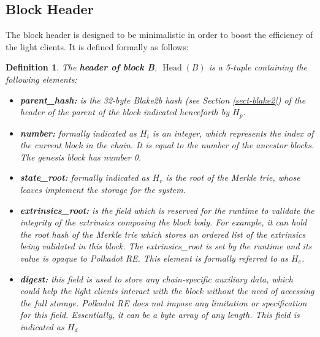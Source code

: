 \documentclass{article}
\newcommand{\tmop}[1]{\ensuremath{\operatorname{#1}}}
\newcommand{\tmsamp}[1]{\textsf{#1}}
\newcommand{\tmstrong}[1]{\textbf{#1}}
\newcommand{\tmtextbf}[1]{{\bfseries{#1}}}
\newcommand{\tmtextsf}[1]{{\sffamily{#1}}}
\newtheorem{definition}{Definition}
\providecommand{\tmop}[1]{\ensuremath{\mathrm{#1}}}
\providecommand{\tmsamp}[1]{\tmtextsf{#1}}
\providecommand{\tmstrong}[1]{\tmtextbf{#1}}
\providecommand{\tmtextbf}[1]{\tmtextbf{#1}}
\newtheorem{definition}{Definition}
\begin{document}
\subsection{Block Header}\label{block}

The block header is designed to be minimalistic in order to boost the
efficiency of the light clients. It is defined formally as follows:

\begin{definition}
  \label{def-block-header}The {\tmstrong{header of block B}},
  {\tmstrong{$\tmop{Head} (B)$}} is a 5-tuple containing the following
  elements:
  \begin{itemize}
    \item \tmtextbf{{\tmsamp{parent\_hash:}}} is the 32-byte Blake2b hash (see
    Section \ref{sect-blake2}) of the header of the parent of the block
    indicated henceforth by \tmtextbf{$H_p$}.
    
    \item {\tmstrong{{\tmsamp{number:}}}} formally indicated as
    {\tmstrong{$H_i$}} is an integer, which represents the index of the
    current block in the chain. It is equal to the number of the ancestor
    blocks. The genesis block has number 0.
    
    \item {\tmstrong{{\tmsamp{state\_root:}}}} formally indicated as
    {\tmstrong{$H_r$}} is the root of the Merkle trie, whose leaves implement
    the storage for the system.
    
    \item {\tmstrong{{\tmsamp{extrinsics\_root:}}}} is the field which is
    reserved for the runtime to validate the integrity of the extrinsics
    composing the block body. For example, it can hold the root hash of the
    Merkle trie which stores an ordered list of the extrinsics being validated
    in this block. The {\tmsamp{extrinsics\_root}} is set by the runtime and
    its value is opaque to Polkadot RE. This element is formally referred to
    as {\tmstrong{$H_e$}}.
    
    \item {\tmstrong{{\tmsamp{digest:}}}} this field is used to store any
    chain-specific auxiliary data, which could help the light clients interact
    with the block without the need of accessing the full storage. Polkadot RE
    does not impose any limitation or specification for this field.
    Essentially, it can be a byte array of any length. This field is indicated
    as {\tmstrong{$H_d$}}
  \end{itemize}
\end{definition}
\end{document}
